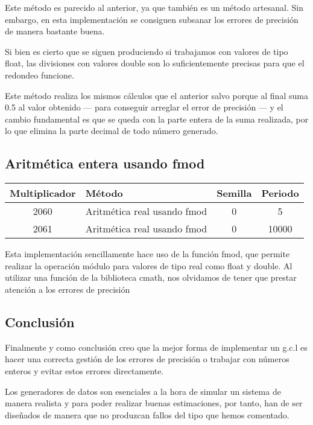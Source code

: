 Este método es parecido al anterior, ya que también es un método artesanal. Sin embargo, en esta implementación se consiguen subsanar los errores de precisión de manera bastante buena.

Si bien es cierto que se siguen produciendo si trabajamos con valores de tipo float, las divisiones con valores double son lo suficientemente precisas para que el redondeo funcione.

Este método realiza los mismos cálculos que el anterior salvo porque al final suma 0.5 al valor obtenido --- para conseguir arreglar el error de precisión --- y el cambio fundamental es que se queda con la parte entera de la suma realizada, por lo que elimina la parte decimal de todo número generado.

\subsection{Aritmética entera usando fmod}
\begin{table}[H]
\centering
\begin{tabular}{|c|l|c|c|}
\hline
\textbf{Multiplicador} & \textbf{Método} & \textbf{Semilla} & \textbf{Periodo} \\ \hline
2060 & Aritmética real usando fmod & 0 & 5 \\
2061 & Aritmética real usando fmod & 0 & 10000 \\ \hline
\end{tabular}
\end{table}

Esta implementación sencillamente hace uso de la función fmod, que permite realizar la operación módulo para valores de tipo real como float y double. Al utilizar una función de la biblioteca cmath, nos olvidamos de tener que prestar atención a los errores de precisión

\subsection{Conclusión}
Finalmente y como conclusión creo que la mejor forma de implementar un g.c.l es hacer una correcta gestión de los errores de precisión o trabajar con números enteros y evitar estos errores directamente.

Los generadores de datos son esenciales a la hora de simular un sistema de manera realista y para poder realizar buenas estimaciones, por tanto, han de ser diseñados de manera que no produzcan fallos del tipo que hemos comentado.

